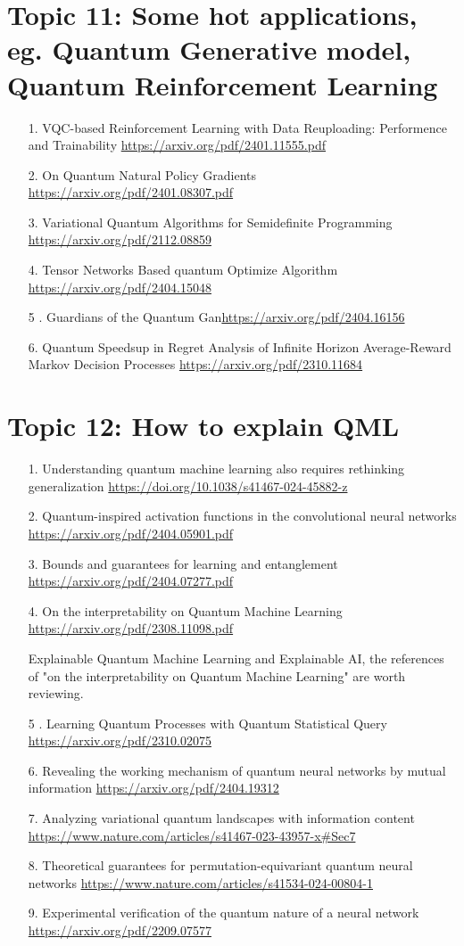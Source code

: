 \documentclass[12pt, oneside]{article}   	%
\begin{document}
\section{Topic 11: Some hot applications, eg. Quantum Generative model, Quantum  Reinforcement Learning}
\begin{itemize}
\item[1. ] VQC-based Reinforcement Learning with Data Reuploading: Performence and Trainability  \url{https://arxiv.org/pdf/2401.11555.pdf}
\item [2. ] On  Quantum Natural Policy Gradients \url{https://arxiv.org/pdf/2401.08307.pdf}
\item [3. ] Variational Quantum Algorithms for Semidefinite Programming \url{https://arxiv.org/pdf/2112.08859}
\item[4. ] Tensor Networks Based quantum Optimize Algorithm \url{https://arxiv.org/pdf/2404.15048}
\item[5 .] Guardians of the Quantum Gan\url{https://arxiv.org/pdf/2404.16156}
\item[6. ] Quantum Speedsup in Regret Analysis of Infinite Horizon Average-Reward Markov Decision Processes \url{https://arxiv.org/pdf/2310.11684} 
\end{itemize}
\section{Topic 12: How to explain QML}
\begin{itemize}
\item[1. ] Understanding quantum machine learning also requires rethinking generalization \url{https://doi.org/10.1038/s41467-024-45882-z}
\item[2. ] Quantum-inspired activation functions in the convolutional neural networks \url{https://arxiv.org/pdf/2404.05901.pdf}
\item[3. ] Bounds and guarantees for learning and entanglement \url{https://arxiv.org/pdf/2404.07277.pdf}
\item[4. ] On the interpretability on Quantum Machine Learning \url{https://arxiv.org/pdf/2308.11098.pdf} 
\par Explainable Quantum Machine Learning and Explainable AI, the references of "on the interpretability on Quantum Machine Learning" are worth reviewing.
\item[5 .] Learning Quantum Processes with Quantum Statistical Query \url{https://arxiv.org/pdf/2310.02075}
\item[6. ] Revealing the working mechanism of quantum neural networks by mutual information \url{https://arxiv.org/pdf/2404.19312}
\item[7. ] Analyzing variational quantum landscapes with information content \url{https://www.nature.com/articles/s41467-023-43957-x#Sec7}
\item[8. ] Theoretical guarantees for permutation-equivariant quantum neural networks \url{https://www.nature.com/articles/s41534-024-00804-1}
\item[9. ] Experimental verification of the quantum nature of a neural network \url{https://arxiv.org/pdf/2209.07577}
\end{itemize}
\end{document}
